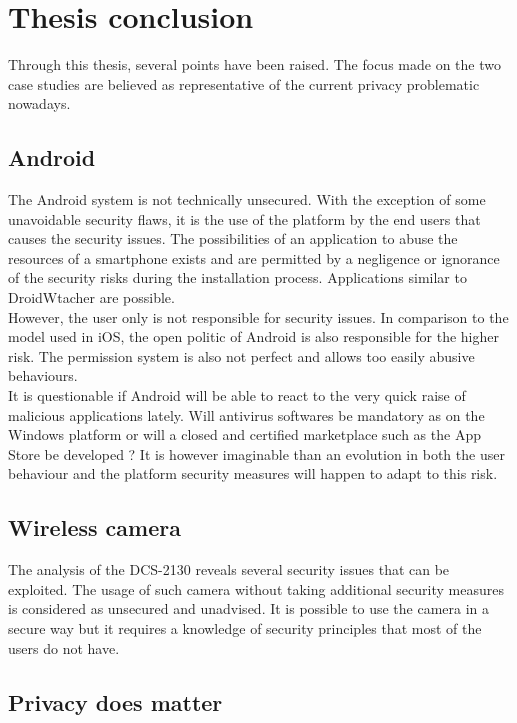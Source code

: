 \chapter{Thesis conclusion}

Through this thesis, several points have been raised.
The focus made on the two case studies are believed as representative of the current privacy problematic nowadays.

\section{Android}

The Android system is not technically unsecured.
With the exception of some unavoidable security flaws, it is the use of the platform by the end users that causes the security issues.
The possibilities of an application to abuse the resources of a smartphone exists and are permitted by a negligence or ignorance of the security risks during the installation process.
Applications similar to DroidWtacher are possible.\\

However, the user only is not responsible for security issues.
In comparison to the model used in iOS, the open politic of Android is also responsible for the higher risk.
The permission system is also not perfect and allows too easily abusive behaviours.\\

It is questionable if Android will be able to react to the very quick raise of malicious applications lately.
Will antivirus softwares be mandatory as on the Windows platform or will a closed and certified marketplace such as the App Store be developed ?
It is however imaginable than an evolution in both the user behaviour and the platform security measures will happen to adapt to this risk.

\section{Wireless camera}

The analysis of the DCS-2130 reveals several security issues that can be exploited.
The usage of such camera without taking additional security measures is  considered as unsecured and unadvised.
It is possible to use the camera in a secure way but it requires a knowledge of security principles that most of the users do not have.

\section{Privacy does matter}


